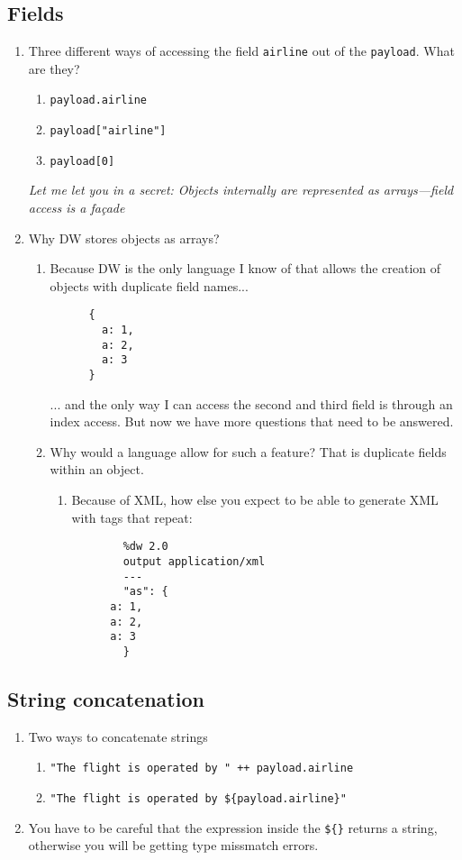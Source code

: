 \subsection{Fields}
\begin{enumerate}[resume*]
\item Three different ways of accessing the field \texttt{airline}
  out of the \texttt{payload}. What are they?
  \begin{enumerate}
  \item \texttt{payload.airline}
  \item \texttt{payload["airline"]}
  \item \texttt{payload[0]}
  \end{enumerate}
  \emph{Let me let you in a secret: Objects internally are represented as arrays—field access is a façade}
\item Why DW stores objects as arrays?
  \begin{enumerate}
  \item Because DW is the only language I know of that allows the creation of objects with
    duplicate field names...
    \begin{lstlisting}
      {
        a: 1,
        a: 2,
        a: 3
      }
    \end{lstlisting}
    ... and the only way I can access the second and third field is through an index access.
    But now we have more questions that need to be answered.
  \item Why would a language allow for such a feature?  That is duplicate fields within an object.
    \begin{enumerate}
    \item Because of XML, how else you expect to be able to generate XML with tags that repeat:
      \begin{lstlisting}
        %dw 2.0
        output application/xml
        ---
        "as": {
	  a: 1,
	  a: 2,
	  a: 3
        }        
      \end{lstlisting}
    \end{enumerate}
  \end{enumerate}
\end{enumerate}

\subsection{String concatenation}
\begin{enumerate}[resume*]
\item Two ways to concatenate strings
  \begin{enumerate}
  \item \texttt{"The flight is operated by " ++ payload.airline}
  \item \texttt{"The flight is operated by \$\{payload.airline\}"}
  \end{enumerate}
\item You have to be careful that the expression inside the \texttt{\$\{\}} returns
  a string, otherwise you will be getting type missmatch errors.
\end{enumerate}

